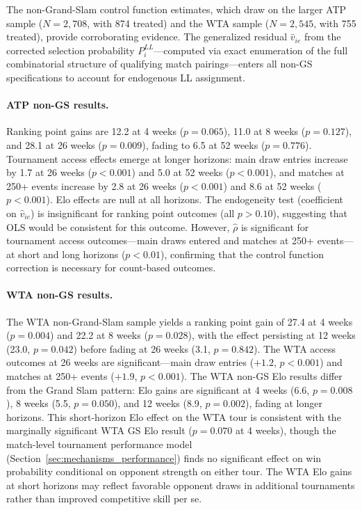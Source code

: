 The non-Grand-Slam control function estimates, which draw on the larger ATP sample ($N = 2{,}708$, with 874 treated) and the WTA sample ($N = 2{,}545$, with 755 treated), provide corroborating evidence. The generalized residual $\hat{v}_{ie}$ from the corrected selection probability $P_i^{LL}$---computed via exact enumeration of the full combinatorial structure of qualifying match pairings---enters all non-GS specifications to account for endogenous LL assignment.

\paragraph{ATP non-GS results.} Ranking point gains are 12.2 at 4 weeks ($p = 0.065$), 11.0 at 8 weeks ($p = 0.127$), and 28.1 at 26 weeks ($p = 0.009$), fading to 6.5 at 52 weeks ($p = 0.776$). Tournament access effects emerge at longer horizons: main draw entries increase by 1.7 at 26 weeks ($p < 0.001$) and 5.0 at 52 weeks ($p < 0.001$), and matches at 250+ events increase by 2.8 at 26 weeks ($p < 0.001$) and 8.6 at 52 weeks ($p < 0.001$). Elo effects are null at all horizons. The endogeneity test (coefficient on $\hat{v}_{ie}$) is insignificant for ranking point outcomes (all $p > 0.10$), suggesting that OLS would be consistent for this outcome. However, $\hat{\rho}$ is significant for tournament access outcomes---main draws entered and matches at 250+ events---at short and long horizons ($p < 0.01$), confirming that the control function correction is necessary for count-based outcomes.

\paragraph{WTA non-GS results.} The WTA non-Grand-Slam sample yields a ranking point gain of 27.4 at 4 weeks ($p = 0.004$) and 22.2 at 8 weeks ($p = 0.028$), with the effect persisting at 12 weeks (23.0, $p = 0.042$) before fading at 26 weeks (3.1, $p = 0.842$). The WTA access outcomes at 26 weeks are significant---main draw entries ($+1.2$, $p < 0.001$) and matches at 250+ events ($+1.9$, $p < 0.001$). The WTA non-GS Elo results differ from the Grand Slam pattern: Elo gains are significant at 4 weeks (6.6, $p = 0.008$), 8 weeks (5.5, $p = 0.050$), and 12 weeks (8.9, $p = 0.002$), fading at longer horizons. This short-horizon Elo effect on the WTA tour is consistent with the marginally significant WTA GS Elo result ($p = 0.070$ at 4 weeks), though the match-level tournament performance model (Section~\ref{sec:mechanisms_performance}) finds no significant effect on win probability conditional on opponent strength on either tour. The WTA Elo gains at short horizons may reflect favorable opponent draws in additional tournaments rather than improved competitive skill per se.

